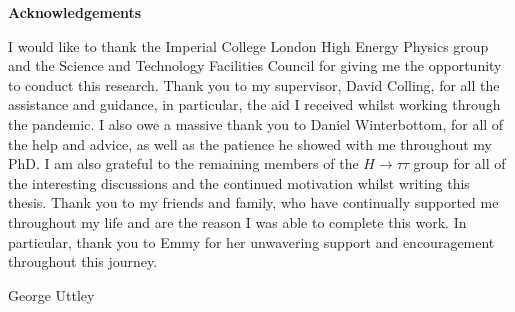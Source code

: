 \begin{titlepage}
\newpage


\vspace*{\fill}
\begin{adjustwidth}{1cm}{1cm}
\begin{center}
\Large \textbf{Acknowledgements}
\vspace{0.5cm}
\end{center}

I would like to thank the Imperial College London High Energy Physics group and the Science and Technology Facilities Council for giving me the opportunity to conduct this research.
Thank you to my supervisor, David Colling, for all the assistance and guidance, in particular, the aid I received whilst working through the pandemic.
I also owe a massive thank you to Daniel Winterbottom, for all of the help and advice, as well as the patience he showed with me throughout my PhD.
I am also grateful to the remaining members of the $H\rightarrow\tau\tau$ group for all of the interesting discussions and the continued motivation whilst writing this thesis.
Thank you to my friends and family, who have continually supported me throughout my life and are the reason I was able to complete this work.
In particular, thank you to Emmy for her unwavering support and encouragement throughout this journey.

\begin{FlushRight}
George Uttley
\end{FlushRight}
\end{adjustwidth}
\vspace*{\fill}

\end{titlepage}